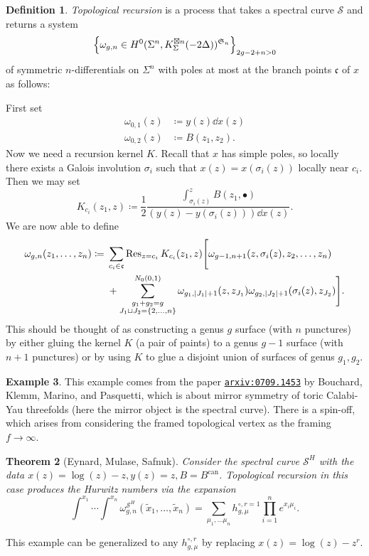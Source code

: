 \documentclass[leqno, openany]{memoir}
\newtheorem{thm}{Theorem}[section]
\theoremstyle{definition}
\newtheorem{defn}[thm]{Definition}
\newtheorem{exm}[thm]{Example}
\theoremstyle{remark}
\theoremstyle{plain}
\theoremstyle{definition}
\theoremstyle{remark}
\newcommand{\mc}[1]{\mathcal{#1}}
\newcommand{\mf}[1]{\mathfrak{#1}}
\newcommand{\mr}[1]{\mathrm{#1}}
\newcommand{\wt}[1]{\widetilde{#1}}
\begin{document}
\begin{defn}\label{defn:tr}
  \textit{Topological recursion} is a process that takes a spectral curve $\mc{S}$ and returns a system
  \[ \qty{\omega_{g,n} \in H^0(\Sigma^n, K_{\Sigma}^{\boxtimes n}(-2\Delta))^{\mf{S}_n}}_{2g-2+n > 0} \]
  of symmetric $n$-differentials on $\Sigma^n$ with poles at most at the branch points $\mf{c}$ of $x$ as follows:

  First set
  \begin{align*}
    \omega_{0,1}(z) &\coloneqq y(z) \dd{x}(z) \\
    \omega_{0,2}(z) &\coloneqq B(z_1, z_2).
  \end{align*}
  Now we need a recursion kernel $K$. Recall that $x$ has simple poles, so locally there exists a Galois involution $\sigma_i$ such that $x(z) = x(\sigma_i(z))$ locally near $c_i$. Then we may set
  \[ K_{c_i}(z_1, z) \coloneqq \frac{1}{2} \frac{\int_{\sigma_i(z)}^z B(z_1, \bullet)}{(y(z) - y(\sigma_i(z))) \dd{x}(z)}. \]
  We are now able to define
  \begin{align*}
    \omega_{g,n}(z_1, \ldots, z_n) \coloneqq {}& \sum_{c_i \in \mf{c}} \Res_{z=c_i} K_{c_i}(z_1,z) \Biggl[\omega_{g-1,n+1}(z,\sigma_i(z),z_2,\ldots,z_n)  \\
                                               &+  \sum_{\substack{g_1+g_2=g \\ J_1 \sqcup J_2 = \qty{2,\ldots,n}}}^{N_0(0,1)} \omega_{g_1,\abs{J_1}+1}(z,z_{J_1}) \omega_{g_2,\abs{J_2}+1}(\sigma_i(z), z_{J_2})\Biggr].
  \end{align*}
  This should be thought of as constructing a genus $g$ surface (with $n$ punctures) by either gluing the kernel $K$ (a pair of paints) to a genus $g-1$ surface (with $n+1$ punctures) or by using $K$ to glue a disjoint union of surfaces of genus $g_1, g_2$.
\end{defn}

\begin{exm}
  This example comes from the paper \href{https://arxiv.org/abs/0709.1453}{\texttt{arxiv:0709.1453}} by Bouchard, Klemm, Marino, and Pasquetti, which is about mirror symmetry of toric Calabi-Yau threefolds (here the mirror object is the spectral curve). There is a spin-off, which arises from considering the framed topological vertex as the framing $f \to \infty$.
  \begin{thm}[Eynard, Mulase, Safnuk]\label{thm:ems}
    Consider the spectral curve $\mc{S}^H$ with the data $x(z) = \log(z)-z, y(z) = z, B = B^{\mr{can}}$. Topological recursion in this case produces the Hurwitz numbers via the expansion
    \[ \int^{x_1} \cdots \int^{x_n} \omega_{g,n}^{\mc{S}^H}(\wt{x}_1, \ldots, \wt{x}_n) = \sum_{\mu_1, \ldots \mu_n} h_{g,\mu}^{\circ,r=1} \prod_{i=1}^n e^{x_i \mu_i}. \]
  \end{thm}
  This example can be generalized to any $h_{g,\mu}^{\circ, r}$ by replacing $x(z) = \log(z)-z^r$. 
\end{exm}
\end{document}
